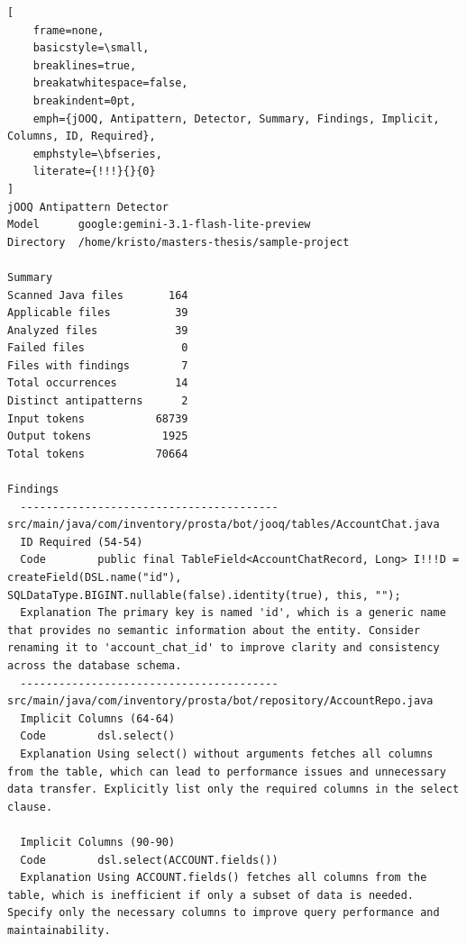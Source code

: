\bigskip %
\begingroup %
\captionsetup{type=figure}
{}\label{fig:toolResults}
\begin{lstlisting}[
    frame=none,
    basicstyle=\small,
    breaklines=true,
    breakatwhitespace=false,
    breakindent=0pt,
    emph={jOOQ, Antipattern, Detector, Summary, Findings, Implicit, Columns, ID, Required},
    emphstyle=\bfseries,
    literate={!!!}{}{0}
]
jOOQ Antipattern Detector
Model      google:gemini-3.1-flash-lite-preview
Directory  /home/kristo/masters-thesis/sample-project

Summary
Scanned Java files       164
Applicable files          39
Analyzed files            39
Failed files               0
Files with findings        7
Total occurrences         14
Distinct antipatterns      2
Input tokens           68739
Output tokens           1925
Total tokens           70664

Findings
  ----------------------------------------
src/main/java/com/inventory/prosta/bot/jooq/tables/AccountChat.java
  ID Required (54-54)
  Code        public final TableField<AccountChatRecord, Long> I!!!D = createField(DSL.name("id"), SQLDataType.BIGINT.nullable(false).identity(true), this, "");
  Explanation The primary key is named 'id', which is a generic name that provides no semantic information about the entity. Consider renaming it to 'account_chat_id' to improve clarity and consistency across the database schema.
  ----------------------------------------
src/main/java/com/inventory/prosta/bot/repository/AccountRepo.java
  Implicit Columns (64-64)
  Code        dsl.select()
  Explanation Using select() without arguments fetches all columns from the table, which can lead to performance issues and unnecessary data transfer. Explicitly list only the required columns in the select clause.

  Implicit Columns (90-90)
  Code        dsl.select(ACCOUNT.fields())
  Explanation Using ACCOUNT.fields() fetches all columns from the table, which is inefficient if only a subset of data is needed. Specify only the necessary columns to improve query performance and maintainability.
\end{lstlisting}

\nopagebreak
\begin{minipage}{\linewidth}
\end{minipage}
\par %
\endgroup %
\bigskip %

